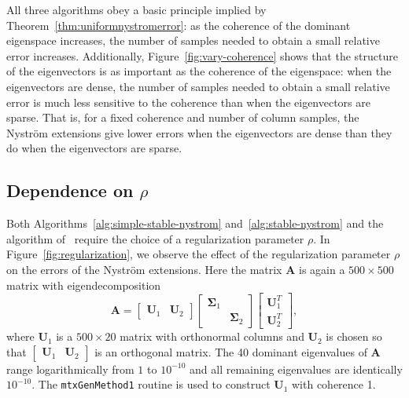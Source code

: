 \documentclass[11pt,letterpaper,twoside,reqno,nosumlimits]{amsart}
\def\transp{T}
\newcommand{\mat}[1]{\ensuremath{\mathbf{#1}}}
\theoremstyle{remark}
\begin{document}
All three algorithms obey a basic principle implied by Theorem~\ref{thm:uniformnystromerror}: as the coherence of the dominant eigenspace increases, the number of samples needed to obtain a small relative error increases. Additionally, Figure~\ref{fig:vary-coherence} shows that the structure of the eigenvectors is as important as the coherence of the eigenspace: when the eigenvectors are dense, the number of samples needed to obtain a small relative error is much less sensitive to the coherence than when the eigenvectors are sparse. That is, for a fixed coherence and number of column samples, the Nystr\"om extensions give lower errors when the eigenvectors are dense than they do when the eigenvectors are sparse. 

\subsection*{Dependence on $\rho$}
Both Algorithms~\ref{alg:simple-stable-nystrom} and~\ref{alg:stable-nystrom} and the algorithm of~\cite{CD11} require the choice of a regularization parameter $\rho.$ In Figure~\ref{fig:regularization}, we observe the effect of the regularization parameter $\rho$ on the errors of the Nystr\"om extensions. Here the matrix $\mat{A}$ is again a $500 \times 500$ matrix with eigendecomposition
\begin{equation}
\mat{A} = [\begin{matrix} \mat{U}_1 & \mat{U}_2 \end{matrix}] 
 \left[ \begin{matrix} \mat{\Sigma}_1 & \\ & \mat{\Sigma}_2 \end{matrix} \right]
 \left[ \begin{matrix} \mat{U}_1^\transp \\ \mat{U}_2^\transp \end{matrix} \right],
 \label{eqn:rhodependencematrix}
\end{equation}
where $\mat{U}_1$ is a $500 \times 20$ matrix with orthonormal columns and $\mat{U}_2$ is chosen so that $[\begin{matrix} \mat{U}_1 & \mat{U}_2 \end{matrix}]$ is an orthogonal matrix. The 40 dominant eigenvalues of $\mat{A}$ range logarithmically from $1$ to $10^{-10}$ and all remaining eigenvalues are identically $10^{-10}.$ The \texttt{mtxGenMethod1} routine is used to construct $\mat{U}_1$ with coherence 1. 
\end{document}
